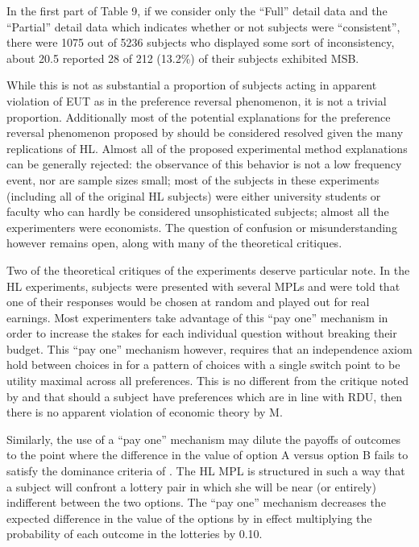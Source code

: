 \documentclass[../main.tex]{subfiles}
\begin{document}
In the first part of Table 9, if we consider only the \enquote{Full} detail data and the \enquote{Partial} detail data which indicates whether or not subjects were \enquote{consistent}, there were 1075 out of 5236 subjects who displayed some sort of inconsistency, about 20.5%
\textcite[1647]{Holt2002} reported 28 of 212 (13.2\%) of their subjects exhibited MSB.

While this is not as substantial a proportion of subjects acting in apparent violation of EUT as in the \textcite{Grether1979} preference reversal phenomenon, it is not a trivial proportion.
Additionally most of the potential explanations for the preference reversal phenomenon proposed by \textcite{Grether1979} should be considered resolved given the many replications of HL.
Almost all of the proposed experimental method explanations can be generally rejected: the observance of this behavior is not a low frequency event, nor are sample sizes small; most of the subjects in these experiments (including all of the original HL subjects) were either university students or faculty who can hardly be considered unsophisticated subjects; almost all the experimenters were economists.
The question of confusion or misunderstanding however remains open, along with many of the theoretical critiques.

Two of the theoretical critiques of the \textcite{Grether1979} experiments deserve particular note.
In the HL experiments, subjects were presented with several MPLs and were told that one of their responses would be chosen at random and played out for real earnings.
Most experimenters take advantage of this \enquote{pay one} mechanism in order to increase the stakes for each individual question without breaking their budget.
This \enquote{pay one} mechanism however, requires that an independence axiom hold between choices in for a pattern of choices with a single switch point to be utility maximal across all preferences.
This is no different from the critique noted by \textcite{Holt1986} and \textcite{Karni1987} that should a subject have preferences which are in line with RDU, then there is no apparent violation of economic theory by M.

Similarly, the use of a \enquote{pay one} mechanism may dilute the payoffs of outcomes to the point where the difference in the value of option A versus option B fails to satisfy the dominance criteria of \textcite{Smith1982}.
The HL MPL is structured in such a way that a subject will confront a lottery pair in which she will be near (or entirely) indifferent between the two options.
The \enquote{pay one} mechanism decreases the expected difference in the value of the options by in effect multiplying the probability of each outcome in the lotteries by 0.10. 
\end{document}
